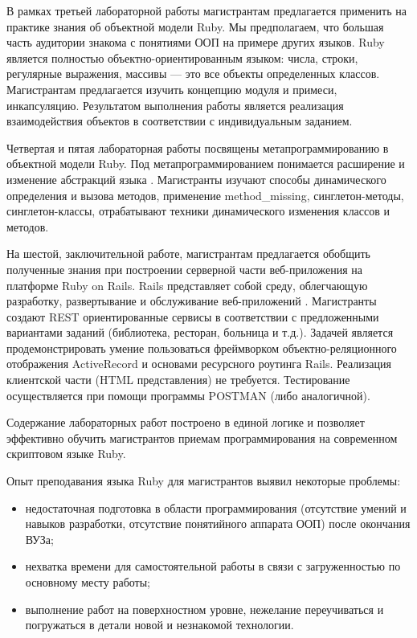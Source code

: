\documentclass[10pt, a5paper]{article}
\begin{document}
В рамках третьей лабораторной работы магистрантам предлагается применить на практике знания об объектной модели Ruby. Мы предполагаем, что большая часть аудитории знакома с понятиями ООП на примере других языков. Ruby является полностью объектно-ориентированным языком: числа, строки, регулярные выражения, массивы --- это все объекты определенных классов.  Магистрантам предлагается изучить концепцию модуля и примеси, инкапсуляцию. Результатом выполнения работы является реализация взаимодействия объектов в соответствии с индивидуальным заданием.

Четвертая и пятая лабораторная работы посвящены метапрограммированию в объектной модели Ruby. Под метапрограммированием понимается расширение и изменение абстракций языка \cite{bib1}. Магистранты изучают способы динамического определения и вызова методов, применение method\_missing, синглетон-методы, синг\-летон-классы, отрабатывают техники динамического изменения \linebreak классов и методов.

На шестой, заключительной работе, магистрантам предлагается обобщить полученные знания при построении серверной части веб-приложения на платформе Ruby on Rails. Rails представляет собой среду, облегчающую разработку, развертывание и обслуживание веб-приложений \cite{bib3}. Магистранты создают REST ориентированные сервисы в соответствии с предложенными вариантами заданий (библиотека, ресторан, больница и т.д.). Задачей является продемонстрировать умение пользоваться фреймворком объектно-реляционного отображения ActiveRecord и основами ресурсного роутинга Rails. Реализация клиентской части (HTML представления) не требуется. Тестирование осуществляется при помощи программы POSTMAN (либо аналогичной).

Содержание лабораторных работ построено в единой логике и позволяет эффективно обучить магистрантов приемам программирования на современном скриптовом языке Ruby.

Опыт преподавания языка Ruby для магистрантов выявил некоторые проблемы:

\begin{itemize}
  \item недостаточная подготовка в области программирования (отсутствие умений и навыков разработки, отсутствие понятийного аппарата ООП) после окончания ВУЗа;
  \item нехватка времени для самостоятельной работы в связи с загруженностью по основному месту работы;
  \item выполнение работ на поверхностном уровне, нежелание переучиваться и погружаться в детали  новой и незнакомой технологии.
\end{itemize}
\end{document}
